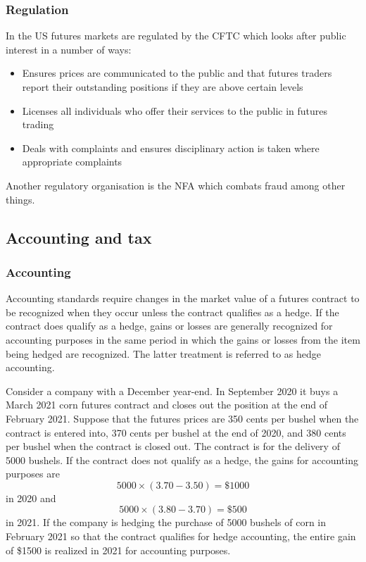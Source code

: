 \subsubsection*{Regulation}

In the US futures markets are regulated by the CFTC which looks after public interest in a number of ways:

\begin{itemize}
    \item Ensures prices are communicated to the public and that futures traders report their outstanding positions if they are above certain levels
    \item Licenses all individuals who offer their services to the public in futures trading
    \item Deals with complaints and ensures disciplinary action is taken where appropriate complaints 
\end{itemize}

Another regulatory organisation is the NFA which combats fraud among other things.

\subsection{Accounting and tax}

\subsubsection*{Accounting}

Accounting standards require changes in the market value of a futures contract to be recognized when they occur unless the contract qualifies as a hedge. If the contract does qualify as a hedge, gains or losses are generally recognized for accounting purposes in the same period in which the gains or losses from the item being hedged are recognized. The latter treatment is referred to as hedge accounting.

\begin{eg}
    Consider a company with a December year-end. In September 2020 it buys a March 2021 corn futures contract and closes out the position at the end of February 2021. Suppose that the futures prices are 350 cents per bushel when the contract is entered into, 370 cents per bushel at the end of 2020, and 380 cents per bushel when the contract is closed out. The contract is for the delivery of 5000 bushels. If the contract does not qualify as a hedge, the gains for accounting purposes are \[5000 \times (3.70 - 3.50) = \$1000\] in 2020 and \[5000 \times (3.80 - 3.70) = \$500\] in 2021. If the company is hedging the purchase of 5000 bushels of corn in February 2021 so that the contract qualifies for hedge accounting, the entire gain of \$1500 is realized in 2021 for accounting purposes.
\end{eg}


